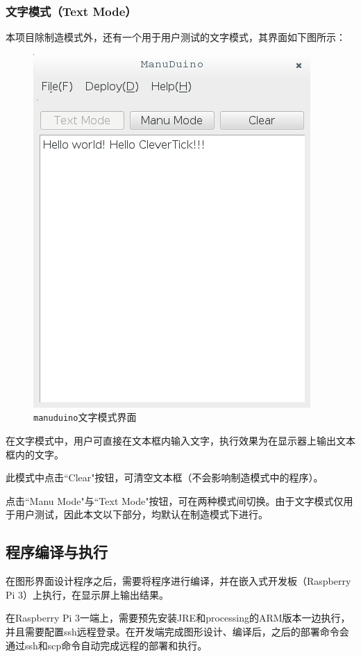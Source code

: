 \documentclass[UTF8]{ctexart}
\begin{document}
\subsubsection{文字模式（Text Mode）}
本项目除制造模式外，还有一个用于用户测试的文字模式，其界面如下图所示：\par
\begin{figure}[htb]
	\centering \includegraphics[scale=0.75]{2.png} \par
	\caption{\texttt{manuduino}文字模式界面}
\end{figure}
在文字模式中，用户可直接在文本框内输入文字，执行效果为在显示器上输出文本框内的文字。\par
此模式中点击``Clear"按钮，可清空文本框（不会影响制造模式中的程序）。\par
点击``Manu Mode"与``Text Mode"按钮，可在两种模式间切换。由于文字模式仅用于用户测试，因此本文以下部分，均默认在制造模式下进行。\par

\subsection{程序编译与执行}
在图形界面设计程序之后，需要将程序进行编译，并在嵌入式开发板（Raspberry Pi 3）上执行，在显示屏上输出结果。\par
在Raspberry Pi 3一端上，需要预先安装JRE和processing的ARM版本一边执行，并且需要配置ssh远程登录。在开发端完成图形设计、编译后，之后的部署命令会通过ssh和scp命令自动完成远程的部署和执行。\par
\end{document}
